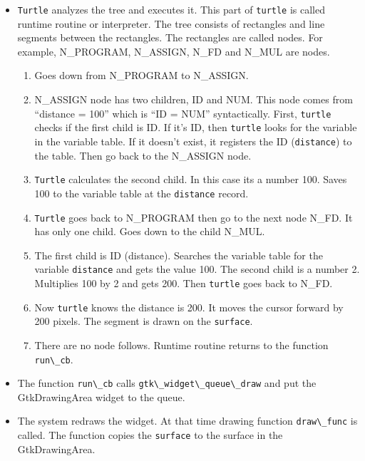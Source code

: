\begin{itemize}
\tightlist
\item
  \passthrough{\lstinline!Turtle!} analyzes the tree and executes it.
  This part of \passthrough{\lstinline!turtle!} is called runtime
  routine or interpreter. The tree consists of rectangles and line
  segments between the rectangles. The rectangles are called nodes. For
  example, N\_PROGRAM, N\_ASSIGN, N\_FD and N\_MUL are nodes.

  \begin{enumerate}
  \def\labelenumi{\arabic{enumi}.}
  \tightlist
  \item
    Goes down from N\_PROGRAM to N\_ASSIGN.
  \item
    N\_ASSIGN node has two children, ID and NUM. This node comes from
    ``distance = 100'' which is ``ID = NUM'' syntactically. First,
    \passthrough{\lstinline!turtle!} checks if the first child is ID. If
    it's ID, then \passthrough{\lstinline!turtle!} looks for the
    variable in the variable table. If it doesn't exist, it registers
    the ID (\passthrough{\lstinline!distance!}) to the table. Then go
    back to the N\_ASSIGN node.
  \item
    \passthrough{\lstinline!Turtle!} calculates the second child. In
    this case its a number 100. Saves 100 to the variable table at the
    \passthrough{\lstinline!distance!} record.
  \item
    \passthrough{\lstinline!Turtle!} goes back to N\_PROGRAM then go to
    the next node N\_FD. It has only one child. Goes down to the child
    N\_MUL.
  \item
    The first child is ID (distance). Searches the variable table for
    the variable \passthrough{\lstinline!distance!} and gets the value
    100. The second child is a number 2. Multiplies 100 by 2 and gets
    200. Then \passthrough{\lstinline!turtle!} goes back to N\_FD.
  \item
    Now \passthrough{\lstinline!turtle!} knows the distance is 200. It
    moves the cursor forward by 200 pixels. The segment is drawn on the
    \passthrough{\lstinline!surface!}.
  \item
    There are no node follows. Runtime routine returns to the function
    \passthrough{\lstinline!run\_cb!}.
  \end{enumerate}
\item
  The function \passthrough{\lstinline!run\_cb!} calls
  \passthrough{\lstinline!gtk\_widget\_queue\_draw!} and put the
  GtkDrawingArea widget to the queue.
\item
  The system redraws the widget. At that time drawing function
  \passthrough{\lstinline!draw\_func!} is called. The function copies
  the \passthrough{\lstinline!surface!} to the surface in the
  GtkDrawingArea.
\end{itemize}

